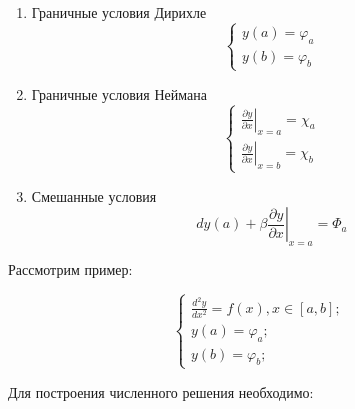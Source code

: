 \documentclass[10pt,a4paper]{article}
\begin{document}
	\begin{enumerate}
		\item Граничные условия Дирихле
		\begin{equation}
			\begin{cases}
				y\left(a\right) = \varphi_{a}
				\\
				y\left(b\right) = \varphi_{b}
			\end{cases}
		\end{equation}
		\item Граничные условия Неймана
		\begin{equation}
			\begin{cases}
				\left.\frac{\partial y}{\partial x}\right|_{x = a} = \chi_{a}
				\\
				\left.\frac{\partial y}{\partial x}\right|_{x = b} = \chi_{b}
			\end{cases}
		\end{equation}
		\item Смешанные условия
		\begin{equation}
			dy\left(a\right) + \left.\beta\frac{\partial y}{\partial x}\right|
			_{x = a} = \Phi_{a}
		\end{equation}
	\end{enumerate}
	
	Рассмотрим пример:
	
	\begin{equation}
		\begin{cases}
			\frac{d^{2}y}{dx^{2}} = f\left(x\right), x\in \left[a, b\right];
			\\
			y\left(a\right) = \varphi_{a};
			\\
			y\left(b\right) = \varphi_{b};
		\end{cases}
	\end{equation}
	
	Для построения численного решения необходимо:
	
\end{document}
